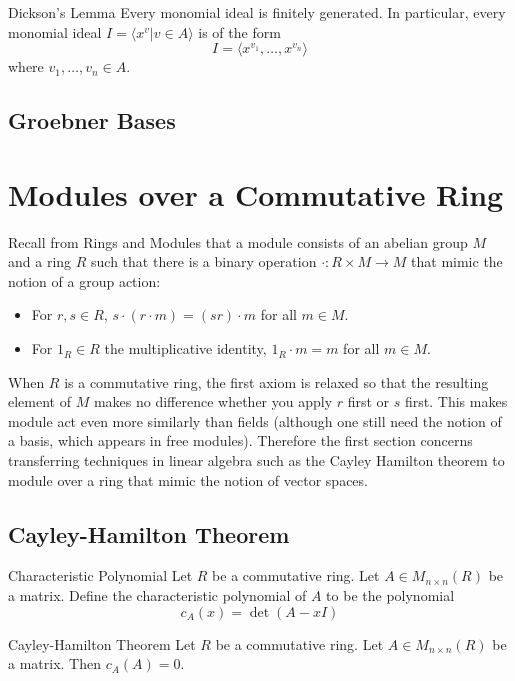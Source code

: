 \documentclass[a4paper]{article}
\begin{document}
\begin{thm}{Dickson's Lemma}{} Every monomial ideal is finitely generated. In particular, every monomial ideal $I=\langle x^v|v\in A\rangle$ is of the form $$I=\langle x^{v_1},\dots,x^{v_n}\rangle$$ where $v_1,\dots,v_n\in A$. 
\end{thm}

\subsection{Groebner Bases}

\pagebreak
\section{Modules over a Commutative Ring}
Recall from Rings and Modules that a module consists of an abelian group $M$ and a ring $R$ such that there is a binary operation $\cdot:R\times M\to M$ that mimic the notion of a group action: 
\begin{itemize}
\item For $r,s\in R$, $s\cdot(r\cdot m)=(sr)\cdot m$ for all $m\in M$. 
\item For $1_R\in R$ the multiplicative identity, $1_R\cdot m=m$ for all $m\in M$. 
\end{itemize}

When $R$ is a commutative ring, the first axiom is relaxed so that the resulting element of $M$ makes no difference whether you apply $r$ first or $s$ first. This makes module act even more similarly than fields (although one still need the notion of a basis, which appears in free modules). Therefore the first section concerns transferring techniques in linear algebra such as the Cayley Hamilton theorem to module over a ring that mimic the notion of vector spaces. 

\subsection{Cayley-Hamilton Theorem}
\begin{defn}{Characteristic Polynomial}{} Let $R$ be a commutative ring. Let $A\in M_{n\times n}(R)$ be a matrix. Define the characteristic polynomial of $A$ to be the polynomial $$c_A(x)=\det(A-xI)$$
\end{defn}

\begin{thm}{Cayley-Hamilton Theorem}{} Let $R$ be a commutative ring. Let $A\in M_{n\times n}(R)$ be a matrix. Then $c_A(A)=0$. 
\end{thm}
\end{document}
